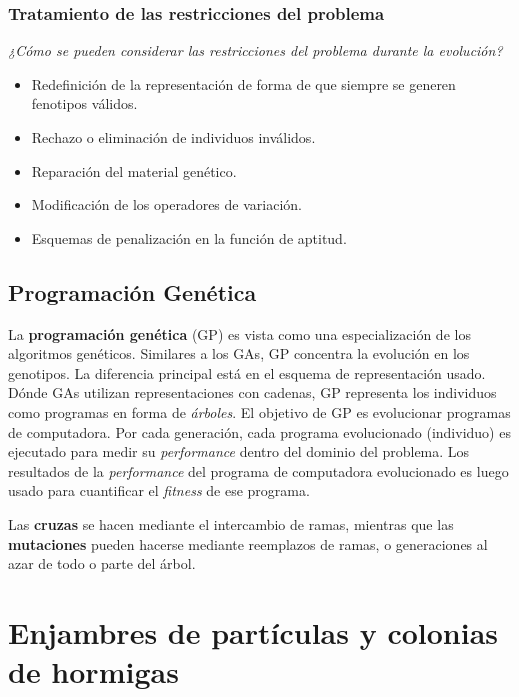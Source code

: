 \documentclass[10pt,a4paper]{article}
\begin{document}
\subsubsection{Tratamiento de las restricciones del problema}

\textit{¿Cómo se pueden considerar las restricciones del problema durante la evolución?}

\begin{itemize}
\item Redefinición de la representación de forma de que siempre se generen fenotipos válidos.
\item Rechazo o eliminación de individuos inválidos.
\item Reparación del material genético.
\item Modificación de los operadores de variación.
\item Esquemas de penalización en la función de aptitud.
\end{itemize}

\subsection{Programación Genética}

La \textbf{programación genética} (GP) es vista como una especialización de los algoritmos genéticos. Similares a los GAs, GP concentra la evolución en los genotipos. La diferencia principal está en el esquema de representación usado. Dónde GAs utilizan representaciones con cadenas, GP representa los individuos como programas en forma de \textit{árboles}. El objetivo de GP es evolucionar programas de computadora. Por cada generación, cada programa evolucionado (individuo) es ejecutado para medir su \textit{performance} dentro del dominio del problema. Los resultados de la \textit{performance} del programa de computadora evolucionado es luego usado para cuantificar el \textit{fitness} de ese programa.

Las \textbf{cruzas} se hacen mediante el intercambio de ramas, mientras que las \textbf{mutaciones} pueden hacerse mediante reemplazos de ramas, o generaciones al azar de todo o parte del árbol.


\section{Enjambres de partículas y colonias de hormigas}
\end{document}

